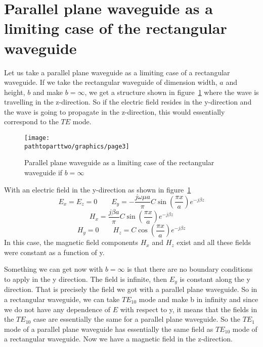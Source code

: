 \section{Parallel plane waveguide as a limiting case of the rectangular waveguide}
Let us take a parallel plane waveguide as a limiting case of a rectangular waveguide. If we take the rectangular waveguide of dimension width, $a$ and height, $b$ and make ${b=\infty}$, we get a structure shown in figure~\ref{fig:page3} where the wave is travelling in the z-direction. So if the electric field resides in the y-direction and the wave is going to propagate in the z-direction, this would essentially correspond to the $TE$ mode. 
\begin{figure}[h]
\centering
\texttt{[image: \\pathtoparttwo/graphics/page3]}
\caption{Parallel plane waveguide as a limiting case of the rectangular waveguide if $b=\infty$}
\label{fig:page3}
\end{figure}

With an electric field in the y-direction as shown in figure~\ref{fig:page3}
\begin{dmath*}
{E_x = E_z = 0 \qquad E_y = - \frac{j\omega\mu a}{\pi} C\sin(\frac{\pi x}{a})e^{-j\beta z}}
\end{dmath*}
\begin{dmath*}
H_x =  \frac{j\beta a}{\pi} C\sin(\dfrac{\pi x}{a})e^{-j\beta z}
\end{dmath*}
\begin{dmath*}
H_y = 0\qquad H_z = C\cos(\dfrac{\pi x}{a})e^{-j\beta z} 
\end{dmath*}
In this case, the magnetic field components ${H_x}$ and ${H_z}$ exist and all these fields were constant as a function of y. 

Something we can get now with ${b=\infty}$ is that there are no boundary conditions to apply in the y direction. The field is infinite, then ${E_y}$ is constant along the y direction. That is precisely the field we got with a parallel plane waveguide. So in a rectangular waveguide, we can take ${TE_{10}}$ mode and make b in infinity and since we do not have any dependence of $E$ with respect to y, it means that the fields in the ${TE_{10}}$ case are essentially the same for a parallel plane waveguide. So the ${TE_1}$ mode of a parallel plane waveguide has essentially the same field as ${TE_{10}}$ mode of a rectangular waveguide. Now we have a magnetic field in the z-direction. 

